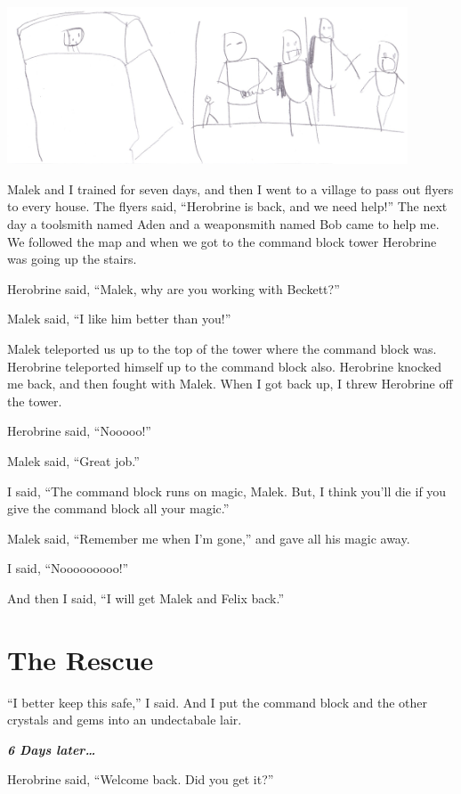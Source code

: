 \documentclass[12pt,twoside]{krantz}
\begin{document}
\includegraphics[width=4.6875in,height=\textheight]{img/final-war/nooooo.jpg}

Malek and I trained for seven days, and then I went to a village to pass
out flyers to every house. The flyers said, ``Herobrine is back, and we
need help!'' The next day a toolsmith named Aden and a weaponsmith named
Bob came to help me. We followed the map and when we got to the command
block tower Herobrine was going up the stairs.

Herobrine said, ``Malek, why are you working with Beckett?''

Malek said, ``I like him better than you!''

Malek teleported us up to the top of the tower where the command block
was. Herobrine teleported himself up to the command block also.
Herobrine knocked me back, and then fought with Malek. When I got back
up, I threw Herobrine off the tower.

Herobrine said, ``Nooooo!''

Malek said, ``Great job.''

I said, ``The command block runs on magic, Malek. But, I think you'll
die if you give the command block all your magic.''

Malek said, ``Remember me when I'm gone,'' and gave all his magic away.

I said, ``Nooooooooo!''

And then I said, ``I will get Malek and Felix back.''

\hypertarget{the-rescue}{%
\section{The Rescue}\label{the-rescue}}

``I better keep this safe,'' I said. And I put the command block and the
other crystals and gems into an undectabale lair.

\textbf{\emph{6 Days later\ldots{}}}

Herobrine said, ``Welcome back. Did you get it?''
\end{document}
